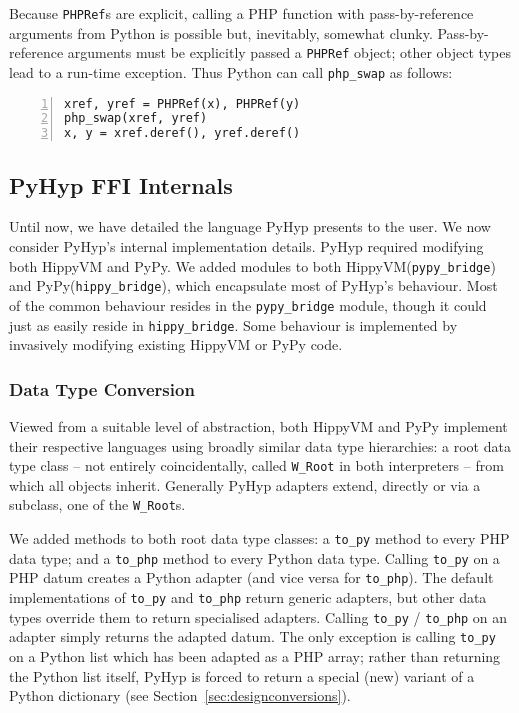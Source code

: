 \documentclass[a4paper,UKenglish]{lipics-v2016}
\newcommand{\ourvm}{PyHyp\xspace}
\newcommand{\hippy}{HippyVM\xspace}
\newcommand{\pypy}{PyPy\xspace}
\begin{document}
{Because \texttt{PHPRef}s are explicit, calling a PHP function with
pass-by-reference arguments from Python is possible but, inevitably,
somewhat clunky. Pass-by-reference arguments must be explicitly passed a
\texttt{PHPRef} object; other object types lead to a run-time exception.
Thus Python can call \texttt{php\_swap} as follows:
\begin{lstlisting}[numbers=left]
xref, yref = PHPRef(x), PHPRef(y)
php_swap(xref, yref)
x, y = xref.deref(), yref.deref()
\end{lstlisting}


\subsection{\ourvm FFI Internals}
\label{sec:pyhyp_internals}

Until now, we have detailed the language \ourvm presents to the user.
We now consider \ourvm's internal implementation details.
\ourvm required modifying both \hippy and \pypy. We added
modules to both \hippy (\texttt{pypy\_bridge}) and \pypy (\texttt{hippy\_bridge}),
which encapsulate most of \ourvm's behaviour. Most of
the common behaviour resides in the \texttt{pypy\_bridge}  module, though it could just
as easily reside in \texttt{hippy\_bridge}. Some behaviour is implemented
by invasively modifying existing \hippy or \pypy code.


\subsubsection{Data Type Conversion}
\label{sec:conversions}

Viewed from a suitable level of abstraction, both \hippy and \pypy implement
their respective languages using broadly similar data type hierarchies: a root
data type class -- not entirely coincidentally, called \texttt{W\_Root} in both
interpreters -- from which all objects inherit.
Generally \ourvm adapters extend, directly or via a subclass,
one of the \texttt{W\_Root}s.

We added methods to both root data type classes: a \texttt{to\_py}
method to every PHP data type; and a \texttt{to\_php} method to every
Python data type. Calling \texttt{to\_py} on a PHP datum creates a Python adapter
(and vice versa for \texttt{to\_php}). The default implementations of
\texttt{to\_py} and \texttt{to\_php} return generic adapters, but other
data types override them to return specialised adapters. Calling \texttt{to\_py}
/ \texttt{to\_php} on an adapter simply returns the adapted datum. The only
exception is calling \texttt{to\_py} on a Python list which has been adapted as
a PHP array; rather than returning the Python list itself, \ourvm is forced to
return a special (new) variant of a Python dictionary (see
Section~\ref{sec:designconversions}).

}
\end{document}
